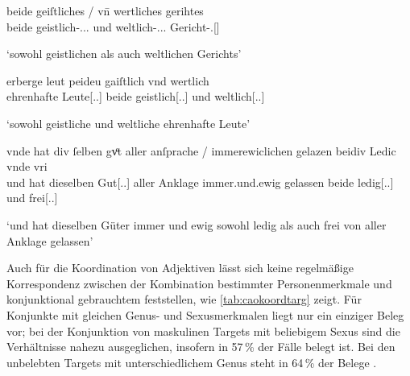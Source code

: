 \begin{exe}
\ex \label{ex:caobeidkoordtarg}
	\begin{xlist}
	\ex \label{ex:caobeidkoordtarg_1}
		\gll beide geiſtliches / vn̄ wertliches gerihtes \\
			beide geistlich-\Gen.\Sg.\NeutI.\St{} {} und
			weltlich-\Gen.\Sg.\NeutI.\St{} Gericht-\Gen.\Sg{}[\NeutI] \\
		\begin{taggedline}{\parencites(Bamberg, 1293)[\pno~1764, 71.26]{cao3}}
		\trans `sowohl geistlichen als auch weltlichen Gerichts'
		\end{taggedline}

	\ex \label{ex:caobeidkoordtarg_2}
		\gll erberge leut peideu gaiſtlich vnd wertlich \\
			ehrenhafte Leute[\Nom.\Pl.\MascA] beide geistlich[\Nom.\Pl.\MascA]
			und weltlich[\Nom.\Pl.\MascA] \\
		\begin{taggedline}{\parencites(Engelthal, Kr.~Nürnberger Land, 1289)[\pno~1153, 431.44]{cao2}}
		\trans `sowohl geistliche und weltliche ehrenhafte Leute'
		\end{taggedline}

	\ex \label{ex:caobeidkoordtarg_3}
		\gll vnde hat {div ſelben} gvͦt \textelp{} aller anſprache /
			immerewiclichen gelazen beidiv Ledic vnde vri \\
			und hat dieselben Gut[\Acc.\Pl.\NeutI] {} aller Anklage {}
			immer.und.ewig gelassen beide ledig[\Acc.\Pl.\NeutI] und
			frei[\Acc.\Pl.\NeutI] \\
		\begin{taggedline}{\parencites(Bamberg, 1295)[\pno~2293, 420.21--23]{cao3}}
		\trans `und hat dieselben Güter \textelp{} immer und ewig sowohl
			ledig als auch frei von aller Anklage gelassen'
		\end{taggedline}
	\end{xlist}
\end{exe}

Auch für die Koordination von Adjektiven lässt sich keine regelmäßige
Korrespondenz zwischen der Kombination bestimmter Personenmerkmale und
konjunktional gebrauchtem  feststellen, wie
\cref{tab:caokoordtarg} zeigt. Für Konjunkte mit gleichen Genus- und
Sexusmerkmalen liegt nur ein einziger Beleg vor; bei der Konjunktion von
maskulinen Targets mit beliebigem Sexus sind die Verhältnisse nahezu
ausgeglichen, insofern in 57\,\% der Fälle  belegt ist. Bei den
unbelebten Targets mit unterschiedlichem Genus steht in 64\,\% der Belege
.

